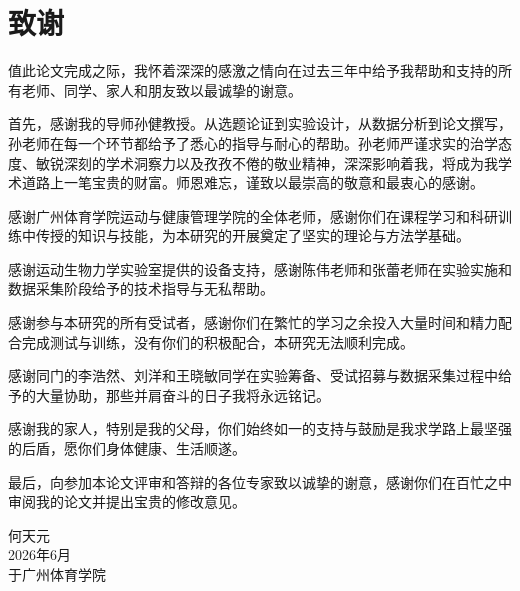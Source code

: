 
\chapter*{致谢}

值此论文完成之际，我怀着深深的感激之情向在过去三年中给予我帮助和支持的所有老师、同学、家人和朋友致以最诚挚的谢意。

首先，感谢我的导师孙健教授。从选题论证到实验设计，从数据分析到论文撰写，孙老师在每一个环节都给予了悉心的指导与耐心的帮助。孙老师严谨求实的治学态度、敏锐深刻的学术洞察力以及孜孜不倦的敬业精神，深深影响着我，将成为我学术道路上一笔宝贵的财富。师恩难忘，谨致以最崇高的敬意和最衷心的感谢。

感谢广州体育学院运动与健康管理学院的全体老师，感谢你们在课程学习和科研训练中传授的知识与技能，为本研究的开展奠定了坚实的理论与方法学基础。

感谢运动生物力学实验室提供的设备支持，感谢陈伟老师和张蕾老师在实验实施和数据采集阶段给予的技术指导与无私帮助。

感谢参与本研究的所有受试者，感谢你们在繁忙的学习之余投入大量时间和精力配合完成测试与训练，没有你们的积极配合，本研究无法顺利完成。

感谢同门的李浩然、刘洋和王晓敏同学在实验筹备、受试招募与数据采集过程中给予的大量协助，那些并肩奋斗的日子我将永远铭记。

感谢我的家人，特别是我的父母，你们始终如一的支持与鼓励是我求学路上最坚强的后盾，愿你们身体健康、生活顺遂。

最后，向参加本论文评审和答辩的各位专家致以诚挚的谢意，感谢你们在百忙之中审阅我的论文并提出宝贵的修改意见。

\vspace{2cm}
\begin{flushright}
何天元\\
2026年6月\\
于广州体育学院
\end{flushright}
